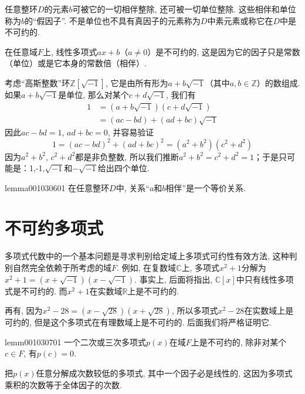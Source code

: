任意整环$D$的元素$b$可被它的一切相伴整除, 还可被一切单位整除. 这些相伴和单位称为$b$的“假因子”. 不是单位也不具有真因子的元素称为$D$中素元素或称它在$D$中是不可约的. 

\begin{example}\label{exam001030605}
在任意域$F$上, 线性多项式$ax+b$（$a \neq 0$）是不可约的, 这是因为它的因子只是常数（单位）或是它本身的常数倍（相伴）. 
\end{example}

\begin{example}\label{exam001030606}
考虑“高斯整数”环$\mathbb{Z}[\sqrt{-1}]$, 它是由所有形为$a + b\sqrt{-1}$（其中$a, b \in \mathbb{Z}$）的数组成. 如果$a + b\sqrt{-1}$是单位, 那么对某个$c + d\sqrt{-1}$, 我们有
\[
\begin{aligned}
1 &= (a + b\sqrt{-1})(c+d\sqrt{-1}) \\
&=(ac - bd) + (ad + bc)\sqrt{-1}
\end{aligned}
\]
因此$ac-bd = 1$, $ad+bc = 0$, 并容易验证
\[
1 = (ac-bd)^2 + (ad+bc)^2 = (a^2+b^2)(c^2+d^2)
\]
因为$a^2+b^2$, $c^2+d^2$都是非负整数, 所以我们推断$a^2+b^2=c^2+d^2=1$；于是只可能是：1,-1,$\sqrt{-1}$和$-\sqrt{-1}$给出四个单位. 
\end{example}

\begin{lemma}{}{lemma001030601}
在任意整环$D$中, 关系“$a$和$b$相伴”是一个等价关系. 
\end{lemma}


\section{不可约多项式}\label{subsection0010307}
多项式代数中的一个基本问题是寻求判别给定域上多项式可约性有效方法, 这种判别自然完全依赖于所考虑的域$F$. 例如, 在复数域$\mathbb{C}$上, 多项式$x^2+1$分解为$x^2+1=(x+\sqrt{-1})(x-\sqrt{-1})$. 事实上, 后面将指出, $\mathbb{C}[x]$中只有线性多项式是不可约的. 而$x^2+1$在实数域$\mathbb{R}$上是不可约的. 

再有, 因为$x^2-28=(x-\sqrt{28})(x+\sqrt{28})$, 所以多项式$x^2-28$在实数域上是可约的, 但是这个多项式在有理数域上是不可约的. 后面我们将严格证明它. 

\begin{lemma}{}{lemm001030701}
一个二次或三次多项式$p(x)$在域$F$上是不可约的, 除非对某个$c \in F$, 有$p(c)=0$. 
\end{lemma}

把$p(x)$任意分解成次数较低的多项式, 其中一个因子必是线性的, 这因为多项式乘积的次数等于全体因子的次数. 

